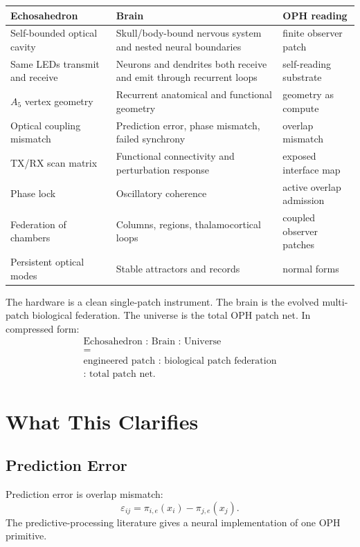 \documentclass[11pt]{article}
\theoremstyle{remark}
\theoremstyle{plain}
\begin{document}
\begin{longtable}{L{0.28\textwidth}L{0.30\textwidth}L{0.32\textwidth}}
\toprule
\textbf{Echosahedron} & \textbf{Brain} & \textbf{OPH reading} \\
\midrule
\endhead
Self-bounded optical cavity & Skull/body-bound nervous system and nested neural boundaries & finite observer patch \\
Same LEDs transmit and receive & Neurons and dendrites both receive and emit through recurrent loops & self-reading substrate \\
\(A_5\) vertex geometry & Recurrent anatomical and functional geometry & geometry as compute \\
Optical coupling mismatch & Prediction error, phase mismatch, failed synchrony & overlap mismatch \\
TX/RX scan matrix & Functional connectivity and perturbation response & exposed interface map \\
Phase lock & Oscillatory coherence & active overlap admission \\
Federation of chambers & Columns, regions, thalamocortical loops & coupled observer patches \\
Persistent optical modes & Stable attractors and records & normal forms \\
\bottomrule
\end{longtable}

The hardware is a clean single-patch instrument. The brain is the evolved multi-patch biological federation. The universe is the total OPH patch net. In compressed form:
\[
\boxed{
\begin{gathered}
\text{Echosahedron : Brain : Universe}\\
=\\
\text{engineered patch : biological patch federation}\\
\text{: total patch net}.
\end{gathered}
}
\]

\section{What This Clarifies}

\subsection{Prediction Error}

Prediction error is overlap mismatch:
\[
\varepsilon_{ij}
=
\pi_{i,e}(x_i)-\pi_{j,e}(x_j).
\]
The predictive-processing literature gives a neural implementation of one OPH primitive.
\end{document}
